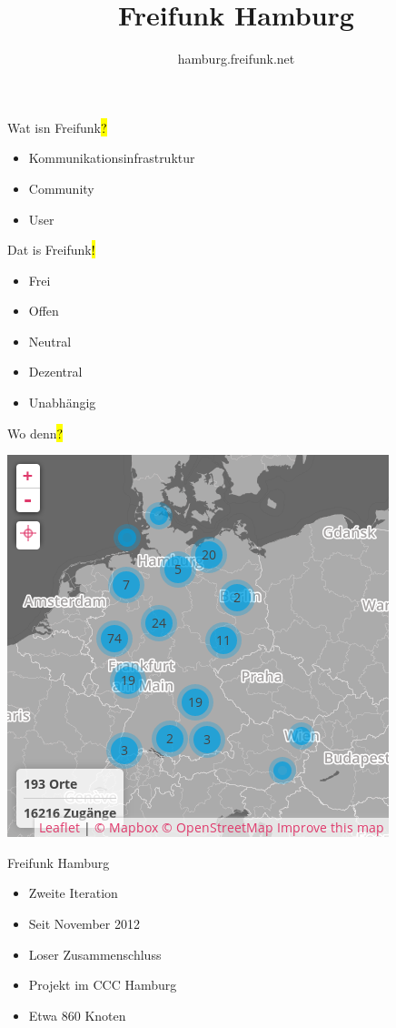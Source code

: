 \documentclass[t]{beamer}
\title{Freifunk Hamburg}
\author{hamburg.freifunk.net}
\date{}
\begin{document}
\maketitle

\begin{frame}{Wat isn Freifunk\hl{?}}
    \begin{itemize}
        \item Kommunikationsinfrastruktur
        \item Community
        \item User
    \end{itemize}
\end{frame}

\begin{frame}{Dat is Freifunk\hl{!}}
    \begin{itemize}
        \item Frei
        \item Offen
        \item Neutral
        \item Dezentral
        \item Unabhängig
    \end{itemize}
\end{frame}

\begin{frame}{Wo denn\hl{?}}
    \begin{center}
        \includegraphics[width=.5\textwidth]{Bilder/community-map-2015-07-20}
    \end{center}
\end{frame}

\begin{frame}{Freifunk Hamburg\ANKER{}}
    \begin{itemize}
        \item Zweite Iteration
        \item Seit November 2012
        \item Loser Zusammenschluss
        \item Projekt im CCC Hamburg
        \item Etwa 860 Knoten
    \end{itemize}
\end{frame}
\end{document}
